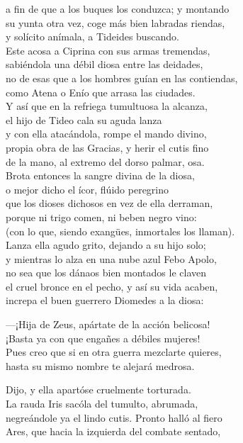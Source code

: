 a fin de que a los buques los conduzca; y montando\\
su yunta otra vez, coge más bien labradas riendas,\\
y solícito anímala, a Tideides buscando.\\
Este acosa a Ciprina con sus armas tremendas,\\
sabiéndola una débil diosa entre las deidades,\\
no de esas que a los hombres guían en las contiendas,\\
como Atena o Enío que arrasa las ciudades.\\
Y así que en la refriega tumultuosa la alcanza,\\
el hijo de Tideo cala su aguda lanza\\
y con ella atacándola, rompe el mando divino,\\
propia obra de las Gracias, y herir el cutis fino\\
de la mano, al extremo del dorso palmar, osa.\\
Brota entonces la sangre divina de la diosa,\\
o mejor dicho el ícor, flúido peregrino\\
que los dioses dichosos en vez de ella derraman,\\
porque ni trigo comen, ni beben negro vino:\\
(con lo que, siendo exangües, inmortales los llaman).\\
Lanza ella agudo grito, dejando a su hijo solo;\\
y mientras lo alza en una nube azul Febo Apolo,\\
no sea que los dánaos bien montados le claven\\
el cruel bronce en el pecho, y así su vida acaben,\\
increpa el buen guerrero Diomedes a la diosa:\par
---¡Hija de Zeus, apártate de la acción belicosa!\\
¡Basta ya con que engañes a débiles mujeres!\\
Pues creo que si en otra guerra mezclarte quieres,\\
hasta su mismo nombre te alejará medrosa.\par
Dijo, y ella apartóse cruelmente torturada.\\
La rauda Iris sacóla del tumulto, abrumada,\\
negreándole ya el lindo cutis. Pronto halló al fiero\\
Ares, que hacia la izquierda del combate sentado,\\
